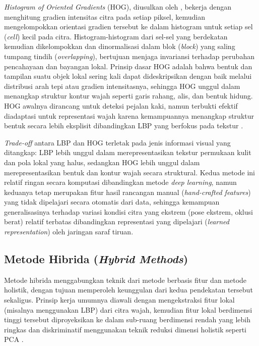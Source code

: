 \textit{Histogram of Oriented Gradients} (HOG), diusulkan oleh \textcite{dalal2005histograms}, bekerja dengan menghitung gradien intensitas citra pada setiap piksel, kemudian mengelompokkan orientasi gradien tersebut ke dalam histogram untuk setiap sel (\textit{cell}) kecil pada citra. Histogram-histogram dari sel-sel yang berdekatan kemudian dikelompokkan dan dinormalisasi dalam blok (\textit{block}) yang saling tumpang tindih (\textit{overlapping}), bertujuan menjaga invariansi terhadap perubahan pencahayaan dan bayangan lokal. Prinsip dasar HOG adalah bahwa bentuk dan tampilan suatu objek lokal sering kali dapat dideskripsikan dengan baik melalui distribusi arah tepi atau gradien intensitasnya, sehingga HOG unggul dalam menangkap struktur kontur wajah seperti garis rahang, alis, dan bentuk hidung. HOG awalnya dirancang untuk deteksi pejalan kaki, namun terbukti efektif diadaptasi untuk representasi wajah karena kemampuannya menangkap struktur bentuk secara lebih eksplisit dibandingkan LBP yang berfokus pada tekstur \autocite{albiol2008face,dalal2005histograms}.

\textit{Trade-off} antara LBP dan HOG terletak pada jenis informasi visual yang ditangkap: LBP lebih unggul dalam merepresentasikan tekstur permukaan kulit dan pola lokal yang halus, sedangkan HOG lebih unggul dalam merepresentasikan bentuk dan kontur wajah secara struktural. Kedua metode ini relatif ringan secara komputasi dibandingkan metode \textit{deep learning}, namun keduanya tetap merupakan fitur hasil rancangan manual (\textit{hand-crafted features}) yang tidak dipelajari secara otomatis dari data, sehingga kemampuan generalisasinya terhadap variasi kondisi citra yang ekstrem (pose ekstrem, oklusi berat) relatif terbatas dibandingkan representasi yang dipelajari (\textit{learned representation}) oleh jaringan saraf tiruan.

\subsection{Metode Hibrida (\textit{Hybrid Methods})}

Metode hibrida menggabungkan teknik dari metode berbasis fitur dan metode holistik, dengan tujuan memperoleh keunggulan dari kedua pendekatan tersebut sekaligus. Prinsip kerja umumnya diawali dengan mengekstraksi fitur lokal (misalnya menggunakan LBP) dari citra wajah, kemudian fitur lokal berdimensi tinggi tersebut diproyeksikan ke dalam sub-ruang berdimensi rendah yang lebih ringkas dan diskriminatif menggunakan teknik reduksi dimensi holistik seperti PCA \autocite{Trigueros2018}.

